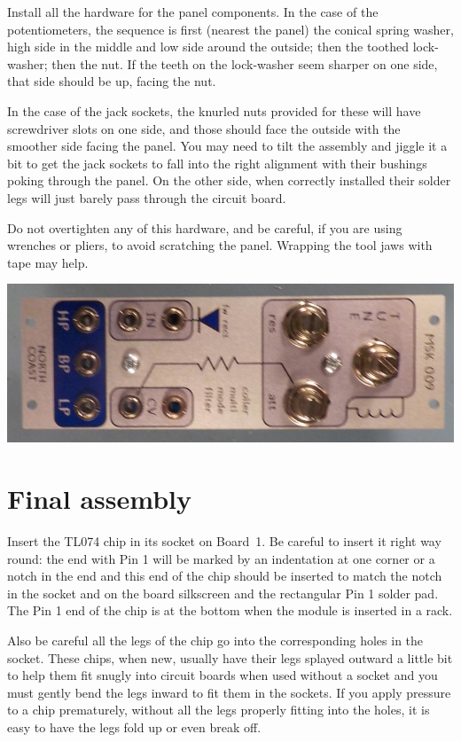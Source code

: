 \pagebreak

Install all the hardware for the panel components.
In the case of the potentiometers, the sequence is first (nearest
the panel) the conical spring washer, high side in the middle and low side
around the outside; then the toothed lock-washer; then the nut.  If the
teeth on the lock-washer seem sharper on one side, that side should be up,
facing the nut.

In the case of the jack sockets, the knurled nuts provided for these will
have screwdriver slots on one side, and those should face the outside with
the smoother side facing the panel.  You may need to tilt the assembly and
jiggle it a bit to get the jack sockets to fall into the right alignment
with their bushings poking through the panel.  On the other side, when
correctly installed their solder legs will just
barely pass through the circuit board.

Do not overtighten any of this hardware, and be careful, if you are
using wrenches or pliers, to avoid scratching the panel.  Wrapping the tool
jaws with tape may help.

\nopagebreak
\noindent\includegraphics[width=\linewidth]{attach-panel.jpg}

\pagebreak

\section{Final assembly}

Insert the TL074 chip in its socket on Board~1.  Be careful to insert it
right way round:  the end with Pin 1 will be marked by an
indentation at one corner or a notch in the end and this end of the chip
should be inserted to match the notch in the socket and on the board
silkscreen and the rectangular Pin 1 solder pad.  The Pin 1 end of the chip
is at the bottom when the module is inserted in a rack.

Also be careful all the legs of the chip go into the corresponding
holes in the socket.  These chips, when new, usually have their legs
splayed outward a little bit to help them fit snugly
into circuit boards when used without a socket and you must gently bend the
legs inward to fit them in the sockets.  If you apply
pressure to a chip prematurely, without all the legs properly fitting into
the holes, it is easy to have the legs fold up or even break off.

